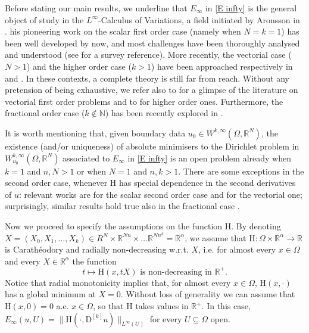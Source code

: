 \documentclass[a4paper,11pt]{article}
\numberwithin{equation}{section}
\newcommand{\numberset}{\mathbb}
\newcommand{\N}{\numberset{N}}
\newcommand{\Om}{\Omega}
\newcommand{\R}{\numberset{R}}
\newcommand{\rom}{\mathrm}
\theoremstyle{definition}
\begin{document}
Before stating our main results, we underline that $E_\infty$ in \eqref{E infty} is the general object of study in the $L^\infty$-Calculus of Variations, a field initiated by Aronsson in \cite{A}. his pioneering work on the scalar first order case (namely when $N=k=1$) has been well developed by now, and most challenges have been thoroughly analysed and understood (see \cite{Kbook} for a survey reference). More recently,  the vectorial case ($N>1$) and the higher order case ($k>1$) have been approached respectively in \cite{K1} and \cite{KM,KP2}. In these contexts, a complete theory is still far from reach. Without any pretension of being exhaustive, we refer also to \cite{K3,K4,KM1} for a glimpse of the literature on vectorial first order problems and to \cite{CKM,DK,KP1,KM2,KM3} for higher order ones. Furthermore, the fractional order case ($k\notin\N$) has been recently explored in \cite{CM}.  

It is worth mentioning that, given boundary data $u_0\in W^{k,\infty}(\Om,\R^N)$, the existence (and/or uniqueness) of absolute minimisers to the Dirichlet problem in $W_{u_0}^{k,\infty}(\Om,\R^N)$ associated to $E_\infty$ in \eqref{E infty} 
 is an open problem already when $k=1$ and $n,N>1$ or when $N=1$ and $n,k>1$. There are some exceptions in the second order case, whenever $\rom H$ has special dependence in the second derivatives of $u$: relevant works are \cite{KM, KM3, KP2} for the scalar second order case and \cite{CKM} for the vectorial one; surprisingly, similar results hold true also in the fractional case \cite{CM}.

Now we proceed to specify the assumptions on the function $\rom{H}$. By denoting $X=(X_0,X_1,\ldots,X_k)\in R^N\times \R^{Nn}\times\ldots\R^{Nn^k}=\R^\alpha$, we assume that $\rom{H}:\Om\times\R^\alpha\to\R$ is Carathéodory and radially non-decreasing w.r.t. $X$, i.e. for almost every $x\in\Om$ and every $X\in\R^\alpha$ the function
$$
t\mapsto \rom{H}(x,tX) \mbox{ is non-decreasing in }\R^+.
$$
Notice that radial monotonicity implies that, for almost every $x\in\Om$, $\rom{H}(x,\cdot)$ has a global minimum at $X=0$. Without loss of generality we can assume that $\rom{H}(x,0)=0$ a.e. $x\in\Om$, so that $\rom{H}$ takes values in $\R^+$. In this case, $E_\infty(u,U)=\|\rom{H}(\cdot, \mathrm D^{[k]}u)\|_{L^\infty(U)}$ for every $U\subseteq\Om$ open.
\end{document}

